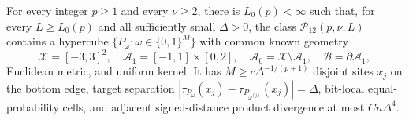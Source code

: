 For every integer \(p\geq1\) and every \(\nu\geq2\), there is \(L_0(p)<\infty\) such that, for every \(L\geq L_0(p)\) and all sufficiently small \(\Delta>0\), the class \(\mathcal P_{12}(p,\nu,L)\) contains a hypercube \(\{P_\omega:\omega\in\{0,1\}^{M}\}\) with common known geometry
\[
 \mathcal X=[-3,3]^2,\quad \mathcal A_1=[-1,1]\times[0,2],\quad \mathcal A_0=\mathcal X\setminus\mathcal A_1,\quad \mathcal B=\partial\mathcal A_1,
\]
Euclidean metric, and uniform kernel.  It has \(M\geq c\Delta^{-1/(p+1)}\) disjoint sites \(x_j\) on the bottom edge, target separation \(|\tau_{P_\omega}(x_j)-\tau_{P_{\omega^{(j)}}}(x_j)|=\Delta\), bit-local equal-probability cells, and adjacent signed-distance product divergence at most \(Cn\Delta^4\).